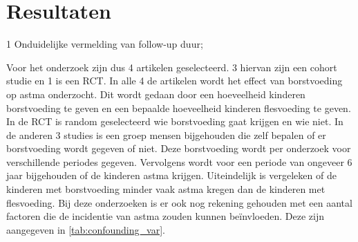 \documentclass[table,abstract=true]{scrartcl}
\begin{document}
\section{Resultaten}
\begin{table}
   \centering
   \begin{threeparttable}
\begin{tablenotes}
\item[1] Onduidelijke vermelding van follow-up duur;
\end{tablenotes}

\end{threeparttable}
\label{tab:overzicht_artcls}
\end{table}

Voor het onderzoek zijn dus 4 artikelen geselecteerd. 3 hiervan zijn een cohort studie en 1 is een RCT. In alle 4 de artikelen wordt het effect van borstvoeding op astma onderzocht. Dit wordt gedaan door een hoeveelheid kinderen borstvoeding te geven en een bepaalde hoeveelheid kinderen flesvoeding te geven. In de RCT is random geselecteerd wie borstvoeding gaat krijgen en wie niet. In de anderen 3 studies is een groep mensen bijgehouden die zelf bepalen of er borstvoeding wordt gegeven of niet. Deze borstvoeding wordt per onderzoek voor verschillende periodes gegeven. Vervolgens wordt voor een periode van ongeveer 6 jaar bijgehouden of de kinderen astma krijgen. Uiteindelijk is vergeleken of de kinderen met borstvoeding minder vaak astma kregen dan de kinderen met flesvoeding. Bij deze onderzoeken is er ook nog rekening gehouden met een aantal factoren die de incidentie van astma zouden kunnen beïnvloeden. Deze zijn aangegeven in \cref{tab:confounding_var}.
\end{document}
